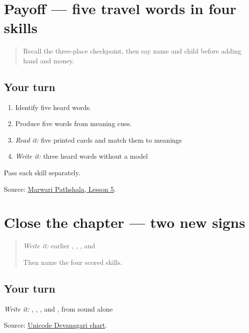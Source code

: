 \section[Practice]{Payoff — five travel words in four skills}

\label{lesson:MW-C10-travel-five}



\begin{quote}
Recall the three-place checkpoint, then say name and child before adding hand and money.
\end{quote}

\subsection*{Your turn}
\begin{enumerate}
\raggedright
  \item Identify five heard words.
  \item Produce five words from meaning cues.
  \item \emph{Read it:} five printed cards and match them to meanings
  \item \emph{Write it:} three heard words without a model
\end{enumerate}

Pass each skill separately.

\begin{tcolorbox}[breakable,colback=teal!4,colframe=teal!35!black,title={Before you move on}]
Source: \href{https://www.marwaripathshala.com/marwari-lesson-5-english}{Marwari Pathshala, Lesson 5}.
\end{tcolorbox}
\section[Practice]{Close the chapter — two new signs}

\label{lesson:MW-R10-script-close}



\begin{quote}
\emph{Write it:} earlier \textbf{}, \textbf{}, \textbf{}, and \textbf{}

Then name the four scored skills.
\end{quote}

\subsection*{Your turn}
\emph{Write it:} \textbf{}, \textbf{}, \textbf{}, and \textbf{}, from sound alone

\begin{tcolorbox}[breakable,colback=teal!4,colframe=teal!35!black,title={Before you move on}]
Source: \href{https://www.unicode.org/charts/PDF/U0900.pdf}{Unicode Devanagari chart}.
\end{tcolorbox}

